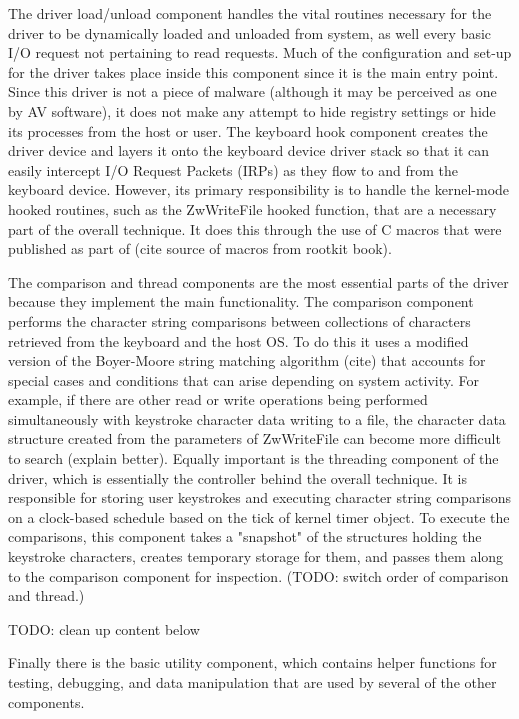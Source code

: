 \documentclass[times, 10pt,twocolumn]{article}
\begin{document}
The driver load/unload component handles the vital routines necessary for the driver to be dynamically loaded and unloaded from system, as well every basic I/O request not pertaining to read requests. Much of the configuration and set-up for the driver takes place inside this component since it is the main entry point. Since this driver is not a piece of malware (although it may be perceived as one by AV software), it does not make any attempt to hide registry settings or hide its processes from the host or user. The keyboard hook component creates the driver device and layers it onto the keyboard device driver stack so that it can easily intercept I/O Request Packets (IRPs) as they flow to and from the keyboard device. However, its primary responsibility is to handle the kernel-mode hooked routines, such as the ZwWriteFile hooked function, that are a necessary part of the overall technique. It does this through the use of C macros that were published as part of (cite source of macros from rootkit book).

The comparison and thread components are the most essential parts of the driver because they implement the main functionality. The comparison component performs the character string comparisons between collections of characters retrieved from the keyboard and the host OS. To do this it uses a modified version of the Boyer-Moore string matching algorithm (cite) that accounts for special cases and conditions that can arise depending on system activity. For example, if there are other read or write operations being performed simultaneously with keystroke character data writing to a file, the character data structure created from the parameters of ZwWriteFile can become more difficult to search (explain better). Equally important is the threading component of the driver, which is essentially the controller behind the overall technique. It is responsible for storing user keystrokes and executing character string comparisons on a clock-based schedule based on the tick of kernel timer object. To execute the comparisons, this component takes a "snapshot" of the structures holding the keystroke characters, creates temporary storage for them, and passes them along to the comparison component for inspection. (TODO: switch order of comparison and thread.) 

TODO: clean up content below

Finally there is the basic utility component, which contains helper functions for testing, debugging, and data manipulation that are used by several of the other components. 
\end{document}
